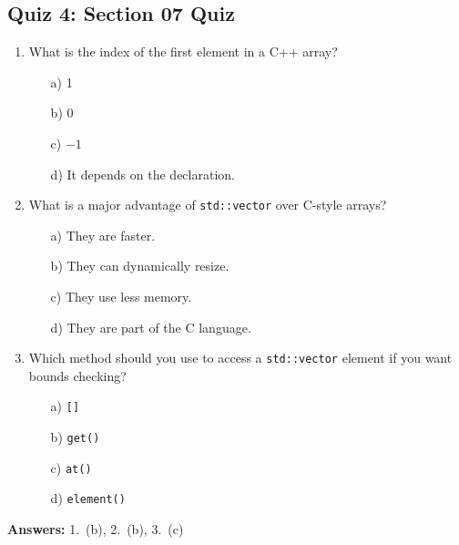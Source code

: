 \subsection{Quiz 4: Section 07 Quiz}
\begin{enumerate}
	\item What is the index of the first element in a C++ array?
	\begin{enumerate}
		\item[a)] 1
		\item[b)] 0
		\item[c)] $-1$
		\item[d)] It depends on the declaration.
	\end{enumerate}

	\item What is a major advantage of \texttt{std::vector} over C-style arrays?
	\begin{enumerate}
		\item[a)] They are faster.
		\item[b)] They can dynamically resize.
		\item[c)] They use less memory.
		\item[d)] They are part of the C language.
	\end{enumerate}

	\item Which method should you use to access a \texttt{std::vector} element if you want bounds checking?
	\begin{enumerate}
		\item[a)] \texttt{[]}
		\item[b)] \texttt{get()}
		\item[c)] \texttt{at()}
		\item[d)] \texttt{element()}
	\end{enumerate}
\end{enumerate}

\textbf{Answers:} 1.\ (b), 2.\ (b), 3.\ (c)
